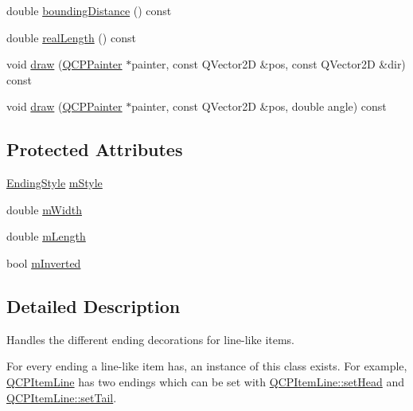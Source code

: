 \begin{DoxyCompactItemize}
double \hyperlink{class_q_c_p_line_ending_a586b45cf738881a70119e353dc1ed59c}{bounding\+Distance} () const 
\item 
double \hyperlink{class_q_c_p_line_ending_a6a528e6dc5aabe1077a573b045715f03}{real\+Length} () const 
\item 
void \hyperlink{class_q_c_p_line_ending_ac4b2fa94bd27b2f008b5fc090fcd7c0b}{draw} (\hyperlink{class_q_c_p_painter}{Q\+C\+P\+Painter} $\ast$painter, const Q\+Vector2\+D \&pos, const Q\+Vector2\+D \&dir) const 
\item 
void \hyperlink{class_q_c_p_line_ending_a05c143b1f66cb68d746c309523c45e3e}{draw} (\hyperlink{class_q_c_p_painter}{Q\+C\+P\+Painter} $\ast$painter, const Q\+Vector2\+D \&pos, double angle) const 
\end{DoxyCompactItemize}
\subsection*{Protected Attributes}
\begin{DoxyCompactItemize}
\item 
\hyperlink{class_q_c_p_line_ending_a5ef16e6876b4b74959c7261d8d4c2cd5}{Ending\+Style} \hyperlink{class_q_c_p_line_ending_a4696fc9117b60f1ca7690fcd2ba56611}{m\+Style}
\item 
double \hyperlink{class_q_c_p_line_ending_aca89d21341133c20dc6825c33a5eac48}{m\+Width}
\item 
double \hyperlink{class_q_c_p_line_ending_ae8e1e2566b96c05736cd92662dba8af8}{m\+Length}
\item 
bool \hyperlink{class_q_c_p_line_ending_a91306fe771d54c955e0af21af14349d5}{m\+Inverted}
\end{DoxyCompactItemize}


\subsection{Detailed Description}
Handles the different ending decorations for line-\/like items. 

 For every ending a line-\/like item has, an instance of this class exists. For example, \hyperlink{class_q_c_p_item_line}{Q\+C\+P\+Item\+Line} has two endings which can be set with \hyperlink{class_q_c_p_item_line_aebf3d687114d584e0459db6759e2c3c3}{Q\+C\+P\+Item\+Line\+::set\+Head} and \hyperlink{class_q_c_p_item_line_ac264222c3297a7efe33df9345c811a5f}{Q\+C\+P\+Item\+Line\+::set\+Tail}.

